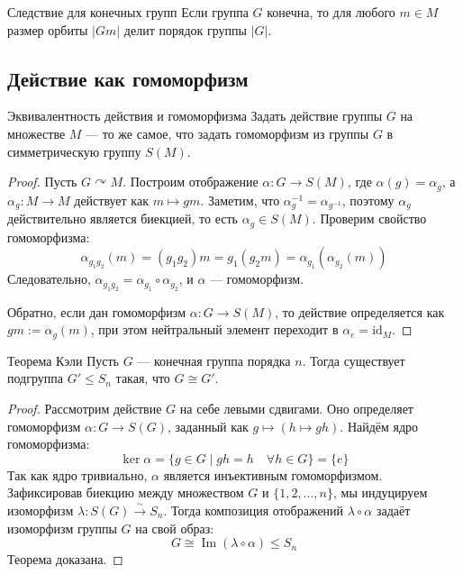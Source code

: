 \begin{Corollary}{Следствие для конечных групп}{}
	Если группа $G$ конечна, то для любого $m \in M$ размер орбиты $|Gm|$ делит порядок группы $|G|$.
\end{Corollary}

\subsection{Действие как гомоморфизм}

\begin{Statement}{Эквивалентность действия и гомоморфизма}{}
	Задать действие группы $G$ на множестве $M$ — то же самое, что задать гомоморфизм из группы $G$ в симметрическую группу $S(M)$.
\end{Statement}

\begin{proof}
	Пусть $G \curvearrowright M$. Построим отображение $\alpha \colon G \to S(M)$, где $\alpha(g) = \alpha_g$, а $\alpha_g \colon M \to M$ действует как $m \mapsto gm$.
	Заметим, что $\alpha_g^{-1} = \alpha_{g^{-1}}$, поэтому $\alpha_g$ действительно является биекцией, то есть $\alpha_g \in S(M)$.
	Проверим свойство гомоморфизма:
	\[ \alpha_{g_1 g_2}(m) = (g_1 g_2)m = g_1(g_2 m) = \alpha_{g_1}(\alpha_{g_2}(m)) \]
	Следовательно, $\alpha_{g_1 g_2} = \alpha_{g_1} \circ \alpha_{g_2}$, и $\alpha$ — гомоморфизм.
	
	Обратно, если дан гомоморфизм $\alpha \colon G \to S(M)$, то действие определяется как $gm := \alpha_g(m)$, при этом нейтральный элемент переходит в $\alpha_e = \text{id}_M$.
\end{proof}

\begin{Theorem}{Теорема Кэли}{}
	Пусть $G$ — конечная группа порядка $n$. Тогда существует подгруппа $G' \le S_n$ такая, что $G \cong G'$.
\end{Theorem}

\begin{proof}
	Рассмотрим действие $G$ на себе левыми сдвигами. Оно определяет гомоморфизм $\alpha \colon G \to S(G)$, заданный как $g \mapsto (h \mapsto gh)$.
	Найдём ядро гомоморфизма:
	\[ \ker \alpha = \{g \in G \mid gh = h \quad \forall h \in G\} = \{e\} \]
	Так как ядро тривиально, $\alpha$ является инъективным гомоморфизмом. Зафиксировав биекцию между множеством $G$ и $\{1, 2, \dots, n\}$, мы индуцируем изоморфизм $\lambda \colon S(G) \xrightarrow{\sim} S_n$.
	Тогда композиция отображений $\lambda \circ \alpha$ задаёт изоморфизм группы $G$ на свой образ:
	\[ G \cong \operatorname{Im}(\lambda \circ \alpha) \le S_n \]
	Теорема доказана.
\end{proof}

